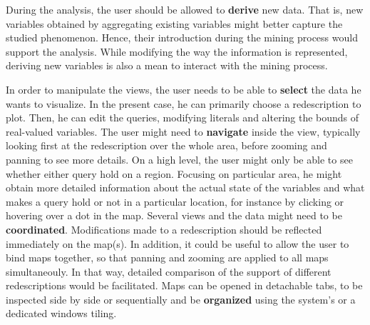 During the analysis, the user should be allowed to \textbf{derive} new
data. That is, new variables obtained by aggregating existing
variables might better capture the studied phenomenon. Hence, their
introduction during the mining process would support the
analysis. While modifying the way the information is represented,
deriving new variables is also a mean to interact with the mining
process.

    In order to manipulate the views, the user needs to be
able to \textbf{select} the data he wants to visualize. In the present
case, he can primarily choose a redescription to plot. Then, he can
edit the queries, modifying literals and altering the bounds of real-valued variables.  The user might need to \textbf{navigate} inside the
view, typically looking first at the redescription over the whole
area, before zooming and panning to see more details. On a high level,
the user might only be able to see whether either query hold on a
region. Focusing on particular area, he might obtain more detailed
information about the actual state of the variables and what makes a
query hold or not in a particular location, for instance by clicking
or hovering over a dot in the map. Several views and the data might
need to be \textbf{coordinated}.  Modifications made to a
redescription should be reflected immediately on the map(s). In
addition, it could be useful to allow the user to bind maps together,
so that panning and zooming are applied to all maps simultaneouly. In
that way, detailed comparison of the support of different
redescriptions would be facilitated.  Maps can be opened in detachable
tabs, to be inspected side by side or sequentially and be
\textbf{organized} using the system's or a dedicated windows tiling.

